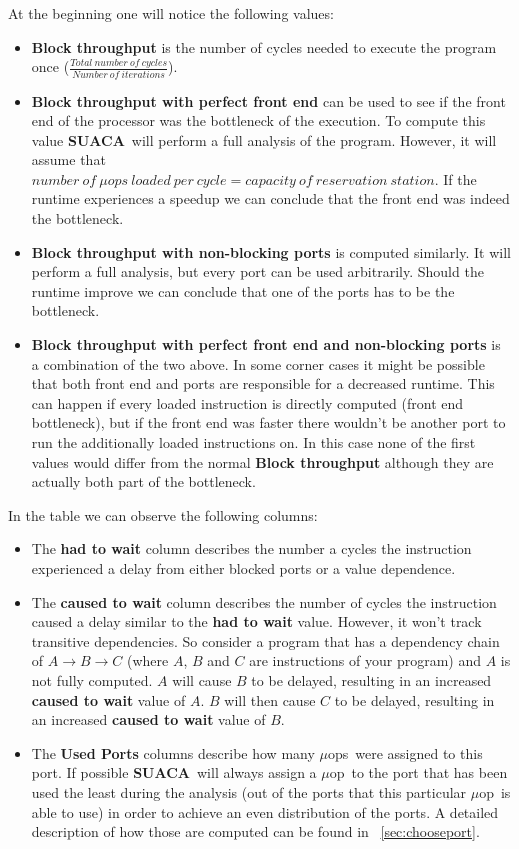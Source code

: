 \documentclass[a4paper,12pt,titlepage, twoside]{report}
\newcommand{\suaca}{\textbf{SUACA}}
\newcommand{\microop}{$\mu$op}
\newcommand{\microops}{$\mu$ops}
\begin{document}
At the beginning one will notice the following values:
\begin{itemize}
    \item \textbf{Block throughput} is the number of cycles needed to execute the program once ($\frac{Total\ number\ of\ cycles}{Number\ of\ iterations}$).
    \item \textbf{Block throughput with perfect front end} can be used to see if the front end of the processor was the bottleneck of the execution. To compute this value \suaca\ will perform a full analysis of the program. However, it will assume that $number\ of\ \mu ops\ loaded\ per\ cycle = capacity\ of\ reservation\ station$. If the runtime experiences a speedup we can conclude that the front end was indeed the bottleneck.
    \item \textbf{Block throughput with non-blocking ports} is computed similarly. It will perform a full analysis, but every port can be used arbitrarily. Should the runtime improve we can conclude that one of the ports has to be the bottleneck.
    \item \textbf{Block throughput with perfect front end and non-blocking ports} is a combination of the two above. In some corner cases it might be possible that both front end and ports are responsible for a decreased runtime. This can happen if every loaded instruction is directly computed (front end bottleneck), but if the front end was faster there wouldn't be another port to run the additionally loaded instructions on. In this case none of the first values would differ from the normal \textbf{Block throughput} although they are actually both part of the bottleneck.
\end{itemize}


In the table we can observe the following columns:
\begin{itemize}
    \item The \textbf{had to wait} column describes the number a cycles the instruction experienced a delay from either blocked ports or a value dependence. 
    \item The \textbf{caused to wait} column describes the number of cycles the instruction caused a delay similar to the \textbf{had to wait} value. However, it won't track transitive dependencies. So consider a program that has a dependency chain of $A \rightarrow B \rightarrow C$ (where $A$, $B$ and $C$ are instructions of your program) and $A$ is not fully computed. $A$ will cause $B$ to be delayed, resulting in an increased \textbf{caused to wait} value of $A$. $B$ will then cause $C$ to be delayed, resulting in an increased \textbf{caused to wait} value of $B$.
    \item The \textbf{Used Ports} columns describe how many \microops\ were assigned to this port. If possible \suaca\ will always assign a \microop\ to the port that has been used the least during the analysis (out of the ports that this particular \microop\ is able to use) in order to achieve an even distribution of the ports. A detailed description of how those are computed can be found in ~\autoref{sec:chooseport}.
\end{itemize}
\end{document}
